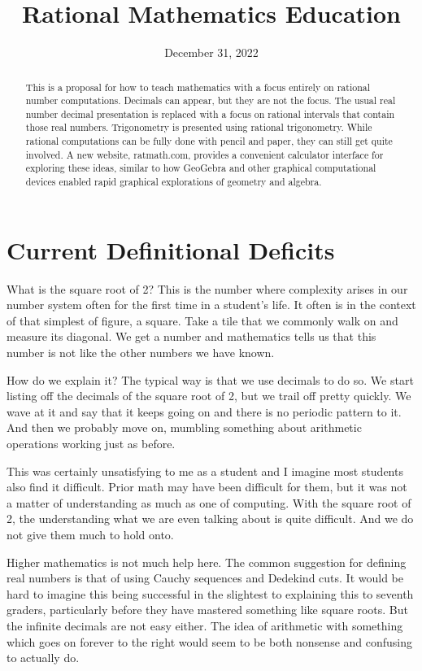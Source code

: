 \documentclass[12pt]{article}
\title{Rational Mathematics Education}
\date{December 31, 2022}
\theoremstyle{remark}
\begin{document}
\maketitle
\begin{abstract}
This is a proposal for how to teach mathematics with a focus entirely on rational number computations. Decimals can appear, but they are not the focus. The usual real number decimal presentation is replaced with a focus on rational intervals that contain those real numbers. Trigonometry is presented using rational trigonometry. While rational computations can be fully done with pencil and paper, they can still get quite involved. A new website, ratmath.com, provides a convenient calculator interface for exploring these ideas, similar to how GeoGebra and other graphical computational devices enabled rapid graphical explorations of geometry and algebra. 
\end{abstract}

\tableofcontents

\section{Current Definitional Deficits}

What is the square root of 2? This is the number where complexity arises in our number system often for the first time in a student's life. It often is in the context of that simplest of figure, a square. Take a tile that we commonly walk on and measure its diagonal. We get a number and mathematics tells us that this number is not like the other numbers we have known. 

How do we explain it? The typical way is that we use decimals to do so. We start listing off the decimals of the square root of 2, but we trail off pretty quickly. We wave at it and say that it keeps going on and there is no periodic pattern to it. And then we probably move on, mumbling something about arithmetic operations working just as before. 

This was certainly unsatisfying to me as a student and I imagine most students also find it difficult. Prior math may have been difficult for them, but it was not a matter of understanding as much as one of computing. With the square root of 2, the understanding what we are even talking about is quite difficult. And we do not give them much to hold onto. 

Higher mathematics is not much help here. The common suggestion for defining real numbers is that of using Cauchy sequences and Dedekind cuts. It would be hard to imagine this being successful in the slightest to explaining this to seventh graders, particularly before they have mastered something like square roots. But the infinite decimals are not easy either. The idea of arithmetic with something which goes on forever to the right would seem to be both nonsense and confusing to actually do. 
\end{document}
